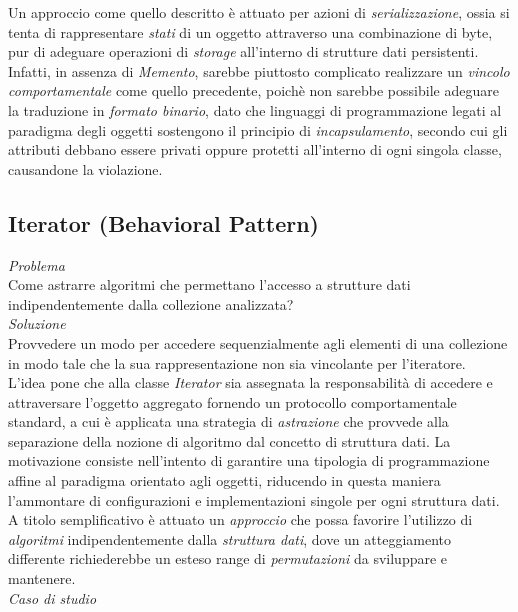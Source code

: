 \documentclass{article}
\begin{document}
Un approccio come quello descritto è attuato per azioni di \textit{serializzazione}, ossia si tenta di rappresentare \textit{stati} di un oggetto attraverso una combinazione di byte, pur di adeguare operazioni di \textit{storage} all'interno di strutture dati persistenti. Infatti, in assenza di \textit{Memento}, sarebbe piuttosto complicato realizzare un \textit{vincolo comportamentale} come quello precedente, poichè non sarebbe possibile adeguare la traduzione in \textit{formato binario}, dato che linguaggi di programmazione legati al paradigma degli oggetti sostengono il principio di \textit{incapsulamento}, secondo cui gli attributi debbano essere privati oppure protetti all'interno di ogni singola classe, causandone la violazione.

\subsection*{Iterator (Behavioral Pattern)}
\large
\textit{Problema}\\
Come astrarre algoritmi che permettano l'accesso a strutture dati indipendentemente dalla collezione analizzata?\vspace*{14pt}\\
\textit{Soluzione}\\
Provvedere un modo per accedere sequenzialmente agli elementi di una collezione in modo tale che la sua rappresentazione non sia vincolante per l'iteratore.\vspace*{14pt}\\
L'idea pone che alla classe \textit{Iterator} sia assegnata la responsabilità di accedere e attraversare l'oggetto aggregato fornendo un protocollo comportamentale standard, a cui è applicata una strategia di \textit{astrazione} che provvede alla separazione della nozione di algoritmo dal concetto di struttura dati. 
La motivazione consiste nell'intento di garantire una tipologia di programmazione affine al paradigma orientato agli oggetti, riducendo in questa maniera l'ammontare di configurazioni e implementazioni singole per ogni struttura dati.\vspace*{7pt}\\
A titolo semplificativo è attuato un \textit{approccio} che possa favorire l'utilizzo di \textit{algoritmi} indipendentemente dalla \textit{struttura dati}, dove un atteggiamento differente richiederebbe un esteso range di \textit{permutazioni} da sviluppare e mantenere.\vspace*{14pt}\\
\textit{Caso di studio}\\
\end{document}
